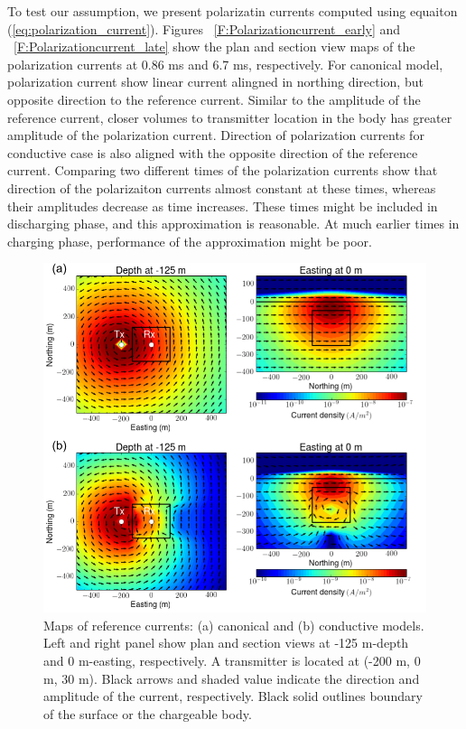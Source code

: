 \documentclass[a4paper, 11pt]{article}
\begin{document}
To test our assumption, we present polarizatin currents computed using equaiton (\ref{eq:polarization_current}). 
Figures ~\ref{F:Polarizationcurrent_early} and ~\ref{F:Polarizationcurrent_late} show the plan and section view maps of the polarization currents at 0.86 ms and 6.7 ms, respectively. 
For canonical model, polarization current show linear current alingned in northing direction, but opposite direction to the reference current. 
Similar to the amplitude of the reference current, closer volumes to transmitter location in the body has greater amplitude of the polarization current. 
Direction of polarization currents for conductive case is also aligned with the opposite direction of the reference current.
Comparing two different times of the polarization currents show that direction of the polarizaiton currents almost constant at these times, whereas their amplitudes decrease as time increases. 
These times might be included in discharging phase, and this approximation is reasonable. 
At much earlier times in charging phase, performance of the approximation might be poor. 

\begin{figure}[htb]
  \centering
  \includegraphics[width=1\textwidth]{figures/ReferenceCurrent.png}
  \caption{Maps of reference currents: (a) canonical and (b) conductive models. Left and right panel show plan and section views at -125 m-depth and 0 m-easting, respectively. A transmitter is located at (-200 m, 0 m, 30 m). Black arrows and shaded value indicate the direction and amplitude of the current, respectively. Black solid outlines boundary of the surface or the chargeable body.}
  \label{F:ReferenceCurrent}
\end{figure}
\end{document}
